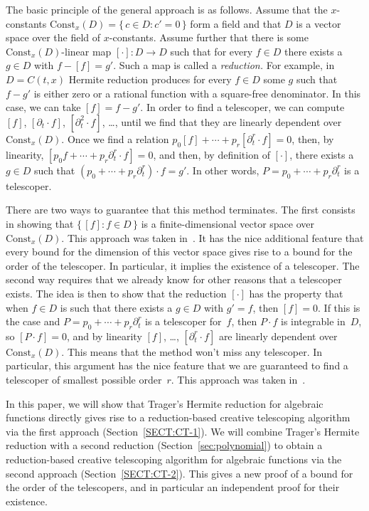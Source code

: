 \documentclass{sig-alternate}
\begin{document}
The basic principle of the general approach is as follows. Assume that the
$x$-constants $\mathrm{Const}_x(D)=\{\,c\in D:c'=0\,\}$ form a field and that $D$
is a vector space over the field of $x$-constants. Assume further that there is
some $\mathrm{Const}_x(D)$-linear map $[\cdot]\colon D\to D$ such that for every
$f\in D$ there exists a $g\in D$ with $f-[f]=g'$. Such a map is called a
\emph{reduction.} For example, in $D=C(t,x)$ Hermite reduction produces for
every $f\in D$ some $g$ such that $f-g'$ is either zero or a rational function
with a square-free denominator. In this case, we can take $[f]=f-g'$.
In order to find a telescoper, we can compute $[f]$, $[\partial_t\cdot f]$, $[\partial_t^2\cdot f]$, \dots,
until we find that they are linearly dependent over $\mathrm{Const}_x(D)$.
Once we find a relation
$p_0[f] + \cdots + p_r[\partial_t^r\cdot f] = 0$,
then, by linearity,
$[p_0 f + \cdots + p_r \partial_t^r\cdot f] = 0$,
and then, by definition of $[\cdot]$, there exists a $g\in D$ such that $(p_0+\cdots + p_r\partial_t^r)\cdot f=g'$.
In other words, $P=p_0+\cdots + p_r\partial_t^r$ is a telescoper.

There are two ways to guarantee that this method terminates. The first consists in
showing that $\{\,[f]:f\in D\,\}$ is a finite-dimensional vector space over
$\mathrm{Const}_x(D)$. This approach was taken in~\cite{BCCL2010,bostan13a}. It has the
nice additional feature that every bound for the dimension of this vector space
gives rise to a bound for the order of the telescoper. In particular, it implies
the existence of a telescoper. The second way requires that we already know for
other reasons that a telescoper exists. The idea is then to show that the
reduction $[\cdot]$ has the property that when $f\in D$ is such that there
exists a $g\in D$ with $g'=f$, then $[f]=0$. If this is the case and
$P=p_0+\cdots+p_r\partial_t^r$ is a telescoper for~$f$, then $P\cdot f$ is integrable
in~$D$, so $[P\cdot f]=0$, and by linearity $[f]$, \dots, $[\partial_t^r\cdot f]$ are
linearly dependent over $\mathrm{Const}_x(D)$. This means that the method won't
miss any telescoper. In particular, this argument has the nice feature that we
are guaranteed to find a telescoper of smallest possible order~$r$. This
approach was taken in~\cite{chen15a}.

In this paper, we will show that Trager's Hermite reduction for algebraic
functions directly gives rise to a reduction-based creative telescoping
algorithm via the first approach (Section~\ref{SECT:CT-1}). We will combine Trager's Hermite reduction
with a second reduction (Section~\ref{sec:polynomial}) to obtain a reduction-based creative
telescoping algorithm for algebraic functions via the second approach (Section~\ref{SECT:CT-2}).
This gives a new proof of a bound for the order of the telescopers, and in
particular an independent proof for their existence.
\end{document}
